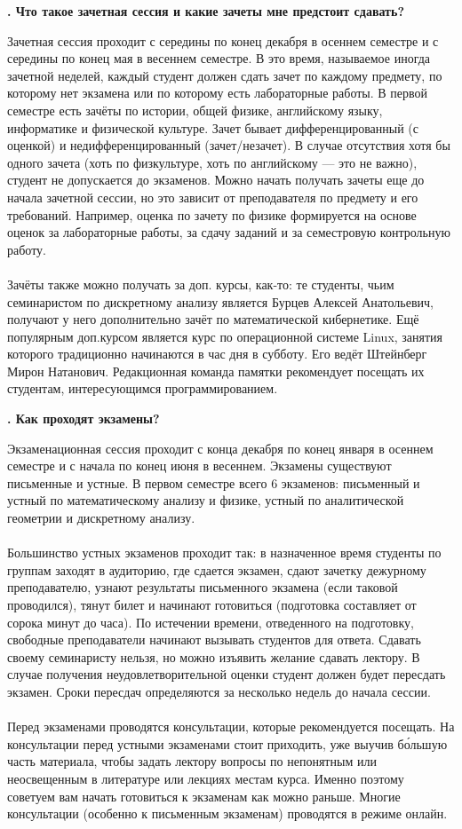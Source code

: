 \documentclass[14pt]{extarticle}
\newcounter{question}
\newcommand\Que[1]{%
    \begin{minipage}{\textwidth}
    \leavevmode\par
    \stepcounter{question}
    \noindent
    {\large\textbf{\thequestion. #1}}\par}
\newcommand\Ans[2][]{%
    \leavevmode\par\noindent
    {\leftskip37pt
    \textbf{#1}#2\par}
    \end{minipage}}
\begin{document}
\Que{Что такое зачетная сессия и какие зачеты мне предстоит сдавать?}
\Ans{Зачетная сессия проходит с середины по конец декабря в осеннем семестре и с середины по конец мая в весеннем семестре. В это время, называемое иногда зачетной неделей, каждый студент должен сдать зачет по каждому предмету, по которому нет экзамена или по которому есть лабораторные работы. В первой семестре есть зачёты по истории, общей физике, английскому языку, информатике и физической культуре. Зачет бывает дифференцированный (с оценкой) и недифференцированный (зачет/незачет). В случае отсутствия хотя бы одного зачета (хоть по физкультуре, хоть по английскому — это не важно), студент не допускается до экзаменов. Можно начать получать зачеты еще до начала зачетной сессии, но это зависит от преподавателя по предмету и его требований. Например, оценка по зачету по физике формируется на основе оценок за лабораторные работы, за сдачу заданий и за семестровую контрольную работу. \\ \\ Зачёты также можно получать за доп. курсы, как-то: те студенты, чьим семинаристом по дискретному анализу является Бурцев Алексей Анатольевич, получают у него дополнительно зачёт по математической кибернетике. Ещё популярным доп.курсом является курс по операционной системе Linux, занятия которого традиционно начинаются в час дня в субботу. Его ведёт Штейнберг Мирон Натанович. Редакционная команда памятки рекомендует посещать их студентам, интересующимся программированием.}

\Que{Как проходят экзамены?}
\Ans{Экзаменационная сессия проходит с конца декабря по конец января в осеннем семестре и с начала по конец июня в весеннем. Экзамены существуют письменные и устные. В первом семестре всего 6 экзаменов: письменный и устный по математическому анализу и физике, устный по аналитической геометрии и дискретному анализу. \\ \\ Большинство устных экзаменов проходит так: в назначенное время студенты по группам заходят в аудиторию, где сдается экзамен, сдают зачетку дежурному преподавателю, узнают результаты письменного экзамена (если таковой проводился), тянут билет и начинают готовиться (подготовка составляет от сорока минут до часа). По истечении времени, отведенного на подготовку, свободные преподаватели начинают вызывать студентов для ответа. Сдавать своему семинаристу нельзя, но можно изъявить желание сдавать лектору. В случае получения неудовлетворительной оценки студент должен будет пересдать экзамен. Сроки пересдач определяются за несколько недель до начала сессии. \\ \\ Перед экзаменами проводятся консультации, которые рекомендуется посещать. На консультации перед устными экзаменами стоит приходить, уже выучив бо́льшую часть материала, чтобы задать лектору вопросы по непонятным или неосвещенным в литературе или лекциях местам курса. Именно поэтому советуем вам начать готовиться к экзаменам как можно раньше. Многие консультации (особенно к письменным экзаменам) проводятся в режиме онлайн.}
\end{document}
